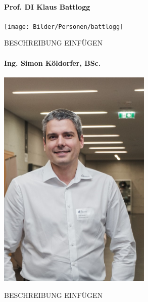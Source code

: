 \paragraph{Prof. DI Klaus Battlogg}
\begin{minipage}{0.37\textwidth}
	\centering
	\texttt{[image: Bilder/Personen/battlogg]}
\end{minipage}
\hfill
\begin{minipage}{0.6\textwidth}
	BESCHREIBUNG EINFÜGEN
\end{minipage}%
\vspace{1ex}

\paragraph{Ing. Simon Köldorfer, BSc.}
\begin{minipage}{0.37\textwidth}
	\centering
	\includegraphics[width=0.55\textwidth]{Bilder/Personen/koeldorfer}
\end{minipage}
\hfill
\begin{minipage}{0.6\textwidth}
	BESCHREIBUNG EINFÜGEN
\end{minipage}%
\vspace{1ex}